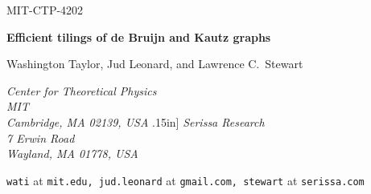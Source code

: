 \documentclass[12pt]{article}
\begin{document}
\pagestyle{plain}
\setcounter{page}{1}

\baselineskip16pt

\begin{titlepage}

\begin{flushright}
MIT-CTP-4202
\end{flushright}
\vspace{8 mm}

\begin{center}

{\Large \bf Efficient tilings of de Bruijn and Kautz graphs\\}
\vspace{3mm}

\end{center}

\vspace{7 mm}


\begin{center}

Washington Taylor, Jud Leonard, 
and Lawrence C.\ Stewart

\vspace{3mm}
{\small \sl Center for Theoretical Physics\\
MIT\\
Cambridge, MA 02139, USA} \0.15in]
{\small \sl 
Serissa Research\\
7 Erwin Road\\
Wayland, MA 01778, USA}\\

\vspace{3mm}

{\small \tt wati} at {\tt mit.edu, jud.leonard} at {\tt gmail.com, stewart} at {\tt serissa.com} \\

\end{center}

\vspace{8 mm}


\end{titlepage}
\end{document}
